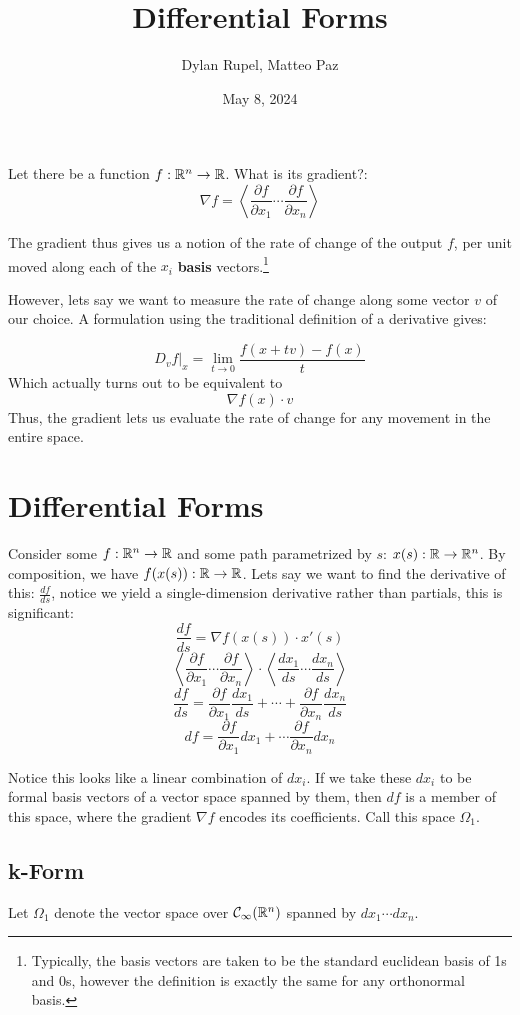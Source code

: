 \documentclass{article}
\author{Dylan Rupel, Matteo Paz}
\date{May 8, 2024}
\title{Differential Forms}
\begin{document}
\maketitle

Let there be a function $f: \mathbb{R}^n \to \mathbb{R}$. What is its gradient?:
\[\nabla f =\left\langle \frac{\partial f}{\partial x_1} \cdots \frac{\partial f}{\partial x_n} \right\rangle \]

The gradient thus gives us a notion of the rate of change of the output $f$, per unit moved along each of the $x_i$ \textbf{basis} vectors.\footnote{Typically, the basis vectors are taken to be the standard euclidean basis of 1s and 0s, however the definition is exactly the same for any orthonormal basis.}

However, lets say we want to measure the rate of change along some vector $v$ of our choice. A formulation using the traditional definition of a derivative gives:

\[D_v f |_x = \lim\limits_{t \to 0} \frac{f(x + tv) - f(x)}{t}\]
Which actually turns out to be equivalent to 
\[\nabla f(x) \cdot v\]
Thus, the gradient lets us evaluate the rate of change for any movement in the entire space.

\section*{Differential Forms}

Consider some $f: \mathbb{R}^n \to \mathbb{R}$ and some path parametrized by $s$: $x(s): \mathbb{R} \to \mathbb{R}^n$. By composition, we have $f(x(s)): \mathbb{R} \to \mathbb{R}$. Lets say we want to find the derivative of this: $\frac{df}{ds}$, notice we yield a single-dimension derivative rather than partials, this is significant:
\[\frac{df}{ds} = \nabla f(x(s)) \cdot x'(s)\]
\[\left\langle \frac{\partial f}{\partial x_1} \cdots \frac{\partial f}{\partial x_n} \right\rangle \cdot \left\langle \frac{dx_1}{ds} \cdots \frac{dx_n}{ds} \right\rangle\]
\[\frac{df}{ds} = \frac{\partial f}{\partial x_1} \frac{dx_1}{ds} + \cdots + \frac{\partial f}{\partial x_n} \frac{dx_n}{ds}\]
\[df = \frac{\partial f}{\partial x_1} dx_1 + \cdots \frac{\partial f}{\partial x_n} dx_n \]

Notice this looks like a linear combination of $dx_i$. If we take these $dx_i$ to be formal basis vectors of a vector space spanned by them, then $df$ is a member of this space, where the gradient $\nabla f$ encodes its coefficients. Call this space $\Omega_1$.

\subsection*{k-Form}
Let $\Omega_1$ denote the vector space over $\mathcal{C}_\infty(\mathbb{R}^n)$ spanned by $dx_1 \cdots dx_n$. 
\end{document}
